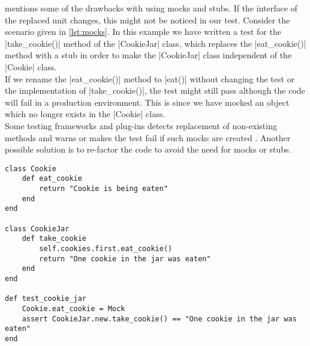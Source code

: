 \citet{video:boundaries} mentions some of the drawbacks with using mocks
and stubs. If the interface of the replaced unit changes, this might not
be noticed in our test. Consider the scenario given in \ref{lst:mocks}.
In this example we have written a test for the |take_cookie()| method of
the |CookieJar| class, which replaces the |eat_cookie()| method with a
stub in order to make the |CookieJar| class independent of the |Cookie|
class.\\

If we rename the |eat_cookie()| method to |eat()| without changing the
test or the implementation of |take_cookie()|, the test might still pass
although the code will fail in a production environment. This is since
we have mocked an object which no longer exists in the |Cookie| class.\\

Some testing frameworks and plug-ins detects replacement of non-existing
methods and warns or makes the test fail if such mocks are created
\cite{video:boundaries}. Another possible solution is to re-factor the
code to avoid the need for mocks or stubs.\\

\begin{lstlisting}[caption=Example of how mocking might make tests unaware
                           of changes which breaks functionality.,
                   label=lst:mocks, float=t]
class Cookie
    def eat_cookie
        return "Cookie is being eaten"
    end
end

class CookieJar
    def take_cookie
        self.cookies.first.eat_cookie()
        return "One cookie in the jar was eaten"
    end
end

def test_cookie_jar
    Cookie.eat_cookie = Mock
    assert CookieJar.new.take_cookie() == "One cookie in the jar was eaten"
end
\end{lstlisting}
